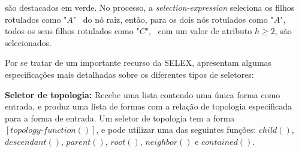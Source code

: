\vspace{0.3cm}

\noindent são destacados em verde. No processo, a \textit{selection-expression} seleciona os filhos rotulados como "$A$" \, do nó raiz, então, para os dois nós rotulados como "$A$", todos os seus filhos rotulados como "$C$", \, com um valor de atributo $h \geq 2$, são selecionados.

\begin{figure}[h!]
	\centering
	\captionsetup{width=15cm}
	{}	
\end{figure}

Por se tratar de um importante recurso da \gls{SELEX},  apresentam algumas especificações mais detalhadas sobre os diferentes tipos de seletores:

\textbf{Seletor de topologia:} Recebe uma lista contendo uma única forma como entrada, e produz uma lista de formas com a relação de topologia especificada para a forma de entrada. Um seletor de topologia tem a forma $[topology\mbox{-}function()]$, e pode utilizar uma das seguintes funções: $child()$, $descendant()$, $parent()$, $root()$, $neighbor()$ e $contained()$.

